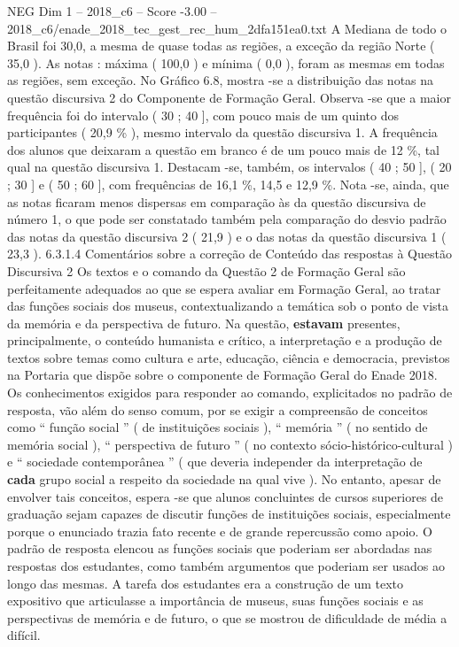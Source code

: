 \begin{textsample}{NEG Dim 1 – 2018\_c6 – Score -3.00 – 2018\_c6/enade\_2018\_tec\_gest\_rec\_hum\_2dfa151ea0.txt}
A Mediana de todo o Brasil foi 30,0, a mesma de quase todas as regiões, a exceção da região Norte ( 35,0 ).
As notas : máxima ( 100,0 ) e mínima ( 0,0 ), foram as mesmas em todas as regiões, sem exceção.
No Gráfico 6.8, mostra -se a distribuição das notas na questão discursiva 2 do Componente de Formação Geral.
Observa -se que a maior frequência foi do intervalo ( 30 ; 40 ], com pouco mais de um quinto dos participantes ( 20,9 \% ), mesmo intervalo da questão discursiva 1.
A frequência dos alunos que deixaram a questão em branco é de um pouco mais de 12 \%, tal qual na questão discursiva 1.
Destacam -se, também, os intervalos ( 40 ; 50 ], ( 20 ; 30 ] e ( 50 ; 60 ], com frequências de 16,1 \%, 14,5 e 12,9 \%.
Nota -se, ainda, que as notas ficaram menos dispersas em comparação às da questão discursiva de número 1, o que pode ser constatado também pela comparação do desvio padrão das notas da questão discursiva 2 ( 21,9 ) e o das notas da questão discursiva 1 ( 23,3 ). 6.3.1.4 Comentários sobre a correção de Conteúdo das respostas à Questão Discursiva 2 Os textos e o comando da Questão 2 de Formação Geral são perfeitamente adequados ao que se espera avaliar em Formação Geral, ao tratar das funções sociais dos museus, contextualizando a temática sob o ponto de vista da memória e da perspectiva de futuro.
Na questão, \textbf{estavam} presentes, principalmente, o conteúdo humanista e crítico, a interpretação e a produção de textos sobre temas como cultura e arte, educação, ciência e democracia, previstos na Portaria que dispõe sobre o componente de Formação Geral do Enade 2018.
Os conhecimentos exigidos para responder ao comando, explicitados no padrão de resposta, vão além do senso comum, por se exigir a compreensão de conceitos como “ função social ” ( de instituições sociais ), “ memória ” ( no sentido de memória social ), “ perspectiva de futuro ” ( no contexto sócio-histórico-cultural ) e “ sociedade contemporânea ” ( que deveria independer da interpretação de \textbf{cada} grupo social a respeito da sociedade na qual vive ).
No entanto, apesar de envolver tais conceitos, espera -se que alunos concluintes de cursos superiores de graduação sejam capazes de discutir funções de instituições sociais, especialmente porque o enunciado trazia fato recente e de grande repercussão como apoio.
O padrão de resposta elencou as funções sociais que poderiam ser abordadas nas respostas dos estudantes, como também argumentos que poderiam ser usados ao longo das mesmas.
A tarefa dos estudantes era a construção de um texto expositivo que articulasse a importância de museus, suas funções sociais e as perspectivas de memória e de futuro, o que se mostrou de dificuldade de média a difícil.

\end{textsample}
